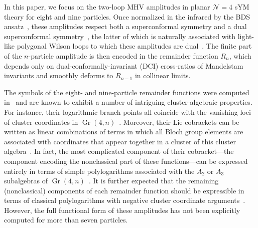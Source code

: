 \documentclass[11pt]{article}
\DeclareMathOperator{\Gr}{Gr}
\begin{document}
\cite{He:2020lcu}
\cite{He:2020uxy}






In this paper, we focus on the two-loop MHV amplitudes in planar $\mathcal{N}=4$ sYM theory for eight and nine particles. Once normalized in the infrared by the BDS ansatz~\cite{Bern:2005iz}, these amplitudes respect both a superconformal symmetry and a dual superconformal symmetry~\cite{Drummond:2007au,Drummond:2006rz,Bern:2006ew,Bern:2007ct,Alday:2007he}, the latter of which is naturally associated with light-like polygonal Wilson loops to which these amplitudes are dual~\cite{Drummond:2007au,Alday:2007hr,Drummond:2007aua,Brandhuber:2007yx,Drummond:2007cf,Bern:2008ap,Drummond:2008aq}. The finite part of the $n$-particle amplitude is then encoded in the remainder function $R_n$, which depends only on dual-conformally-invariant (DCI) cross-ratios of Mandelstam invariants and smoothly deforms to $R_{n{-}1}$ in collinear limits.

The symbols of the eight- and nine-particle remainder functions were computed in~\cite{CaronHuot:2011ky} and are known to exhibit a number of intriguing cluster-algebraic properties. For instance, their logarithmic branch points all coincide with the vanishing loci of cluster coordinates in $\Gr(4,n)$~\cite{Golden:2013xva}. Moreover, their Lie cobrackets can be written as linear combinations of terms in which all Bloch group elements are associated with coordinates that appear together in a cluster of this cluster algebra~\cite{Golden:2014pua}. In fact, the most complicated component of their cobracket---the component encoding the nonclassical part of these functions---can be expressed entirely in terms of simple polylogarithms associated with the $A_2$ or $A_3$ subalgebras of $\Gr(4,n)$~\cite{Golden:2014xqa}. It is further expected that the remaining (nonclassical) components of  each remainder function should be expressible in terms of classical polylogarithms with negative cluster coordinate arguments~\cite{Golden:2014xqf}. However, the full functional form of these amplitudes has not been explicitly computed for more than seven particles. 
\end{document}
